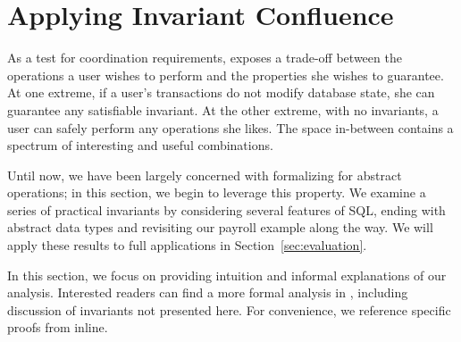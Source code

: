 
\section{Applying Invariant Confluence}
\label{sec:bcc-practice}
\label{sec:merge}

As a test for coordination requirements, \iconfluence exposes a
trade-off between the operations a user wishes to perform and the
properties she wishes to guarantee. At one extreme, if a user's
transactions do not modify database state, she can guarantee any satisfiable
invariant. At the other extreme, with no invariants, a user can safely
perform any operations she likes. The space in-between contains a spectrum of
interesting and useful combinations.

Until now, we have been largely concerned with formalizing
\iconfluence for abstract operations; in this section, we begin to
leverage this property. We examine a series of practical
invariants by considering several features of SQL, ending with
abstract data types and revisiting our payroll example along the
way. We will apply these results to full applications in
Section~\ref{sec:evaluation}.

In this section, we focus on providing intuition and informal
explanations of our \iconfluence analysis. Interested readers can find
a more formal analysis in \rappendix{\appapply},
including discussion of invariants not presented here. For convenience,
we reference specific proofs from \rappendix{\appapply} inline.


